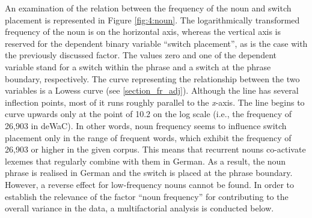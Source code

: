 \begin{table}
\caption{German and mixed noun phrases, ranked in order of lowest (above) and highest (below) frequencies of the nouns involved} \label{tab:4:6}
\end{table}

\begin{sloppypar}
An examination of the relation between the frequency of the noun and switch placement is represented in Figure \ref{fig:4:noun}. The logarithmically transformed frequency of the noun is on the horizontal axis, whereas the vertical axis is reserved for the dependent binary variable “switch placement”, as is the case with the previously discussed factor. The values zero and one of the dependent variable stand for a switch within the phrase and a switch at the phrase boundary, respectively. The curve representing the relationship between the two variables is a Lowess curve (see \ref{section_fr_adj}). Although the line has several inflection points, most of it runs roughly parallel to the \textit{x}-axis. The line begins to curve upwards only at the point of 10.2 on the log scale (i.e., the frequency of 26,903 in deWaC). In other words, noun frequency seems to influence switch placement only in the range of frequent words, which exhibit the frequency of 26,903 or higher in the given corpus. This means that recurrent nouns co-activate lexemes that regularly combine with them in German. As a result, the noun phrase is realised in German and the switch is placed at the phrase boundary. However, a reverse effect for low-frequency nouns cannot be found. In order to establish the relevance of the factor “noun frequency” for contributing to the overall variance in the data, a  multifactorial analysis is conducted below.
\end{sloppypar}

